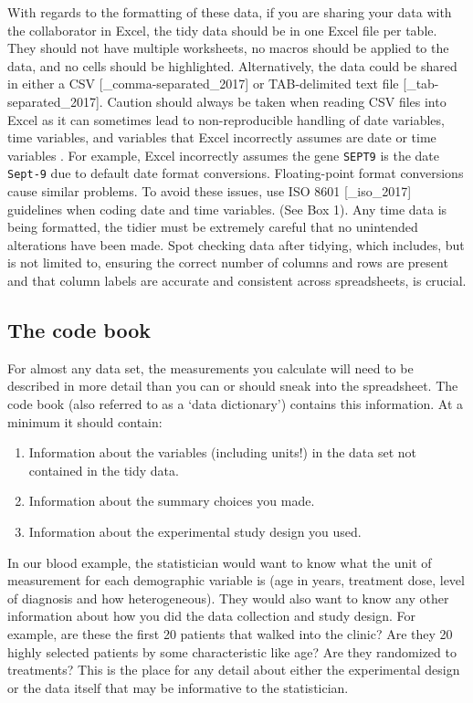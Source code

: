 \documentclass[12pt]{article}
\providecommand{\tightlist}{%
  \setlength{\itemsep}{0pt}\setlength{\parskip}{0pt}}
\begin{document}
With regards to the formatting of these data, if you are sharing your
data with the collaborator in Excel, the tidy data should be in one
Excel file per table. They should not have multiple worksheets, no
macros should be applied to the data, and no cells should be
highlighted. Alternatively, the data could be shared in either a CSV
{[}\_comma-separated\_2017{]} or TAB-delimited text file
{[}\_tab-separated\_2017{]}. Caution should always be taken when reading
CSV files into Excel as it can sometimes lead to non-reproducible
handling of date variables, time variables, and variables that Excel
incorrectly assumes are date or time variables
\citep{zeeberg_mistaken_2004}. For example, Excel incorrectly assumes
the gene \texttt{SEPT9} is the date \texttt{Sept-9} due to default date
format conversions. Floating-point format conversions cause similar
problems. To avoid these issues, use ISO 8601 {[}\_iso\_2017{]}
guidelines when coding date and time variables. (See Box 1). Any time
data is being formatted, the tidier must be extremely careful that no
unintended alterations have been made. Spot checking data after tidying,
which includes, but is not limited to, ensuring the correct number of
columns and rows are present and that column labels are accurate and
consistent across spreadsheets, is crucial.

\subsection{The code book}\label{the-code-book}

For almost any data set, the measurements you calculate will need to be
described in more detail than you can or should sneak into the
spreadsheet. The code book (also referred to as a `data dictionary')
contains this information. At a minimum it should contain:

\begin{enumerate}
\def\labelenumi{\arabic{enumi}.}
\tightlist
\item
  Information about the variables (including units!) in the data set not
  contained in the tidy data.
\item
  Information about the summary choices you made.
\item
  Information about the experimental study design you used.
\end{enumerate}

In our blood example, the statistician would want to know what the unit
of measurement for each demographic variable is (age in years, treatment
dose, level of diagnosis and how heterogeneous). They would also want to
know any other information about how you did the data collection and
study design. For example, are these the first 20 patients that walked
into the clinic? Are they 20 highly selected patients by some
characteristic like age? Are they randomized to treatments? This is the
place for any detail about either the experimental design or the data
itself that may be informative to the statistician.
\end{document}
